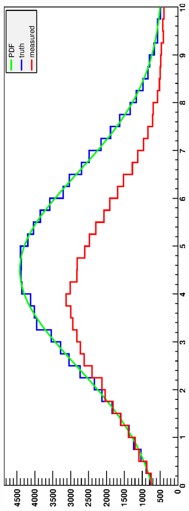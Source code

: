 \documentclass{desyproc}
\begin{document}
\begin{figure}[hb]
\centerline{\includegraphics[angle=-90,width=\textwidth]{adye_tim.bayes1.eps}}\vspace{4ex}%

\end{figure}
\end{document}
